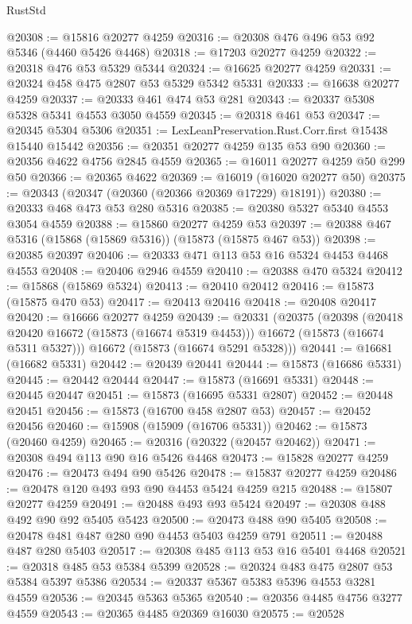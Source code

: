 \begin{lexlean}{RustStd}
\begin{coremodule}
@20308 := @15816 @20277 @4259
@20316 := @20308 @476 @496 @53 @92 @5346 (@4460 @5426 @4468)
@20318 := @17203 @20277 @4259
@20322 := @20318 @476 @53 @5329 @5344
@20324 := @16625 @20277 @4259
@20331 := @20324 @458 @475 @2807 @53 @5329 @5342 @5331
@20333 := @16638 @20277 @4259
@20337 := @20333 @461 @474 @53 @281
@20343 := @20337 @5308 @5328 @5341 @4553 @3050 @4559
@20345 := @20318 @461 @53
@20347 := @20345 @5304 @5306
@20351 := LexLeanPreservation.Rust.Corr.first @15438 @15440 @15442
@20356 := @20351 @20277 @4259 @135 @53 @90
@20360 := @20356 @4622 @4756 @2845 @4559
@20365 := @16011 @20277 @4259 @50 @299 @50
@20366 := @20365 @4622
@20369 := @16019 (@16020 @20277 @50)
@20375 := @20343 (@20347 (@20360 (@20366 @20369 @17229) @18191))
@20380 := @20333 @468 @473 @53 @280 @5316
@20385 := @20380 @5327 @5340 @4553 @3054 @4559
@20388 := @15860 @20277 @4259 @53
@20397 := @20388 @467 @5316 (@15868 (@15869 @5316)) (@15873 (@15875 @467 @53))
@20398 := @20385 @20397
@20406 := @20333 @471 @113 @53 @16 @5324 @4453 @4468 @4553
@20408 := @20406 @2946 @4559
@20410 := @20388 @470 @5324
@20412 := @15868 (@15869 @5324)
@20413 := @20410 @20412
@20416 := @15873 (@15875 @470 @53)
@20417 := @20413 @20416
@20418 := @20408 @20417
@20420 := @16666 @20277 @4259
@20439 := @20331
    (@20375
      (@20398
        (@20418 @20420 @16672 (@15873 (@16674 @5319 @4453)))
        @16672
        (@15873 (@16674 @5311 @5327)))
      @16672
      (@15873 (@16674 @5291 @5328)))
@20441 := @16681 (@16682 @5331)
@20442 := @20439 @20441
@20444 := @15873 (@16686 @5331)
@20445 := @20442 @20444
@20447 := @15873 (@16691 @5331)
@20448 := @20445 @20447
@20451 := @15873 (@16695 @5331 @2807)
@20452 := @20448 @20451
@20456 := @15873 (@16700 @458 @2807 @53)
@20457 := @20452 @20456
@20460 := @15908 (@15909 (@16706 @5331))
@20462 := @15873 (@20460 @4259)
@20465 := @20316 (@20322 (@20457 @20462))
@20471 := @20308 @494 @113 @90 @16 @5426 @4468
@20473 := @15828 @20277 @4259
@20476 := @20473 @494 @90 @5426
@20478 := @15837 @20277 @4259
@20486 := @20478 @120 @493 @93 @90 @4453 @5424 @4259 @215
@20488 := @15807 @20277 @4259
@20491 := @20488 @493 @93 @5424
@20497 := @20308 @488 @492 @90 @92 @5405 @5423
@20500 := @20473 @488 @90 @5405
@20508 := @20478 @481 @487 @280 @90 @4453 @5403 @4259 @791
@20511 := @20488 @487 @280 @5403
@20517 := @20308 @485 @113 @53 @16 @5401 @4468
@20521 := @20318 @485 @53 @5384 @5399
@20528 := @20324 @483 @475 @2807 @53 @5384 @5397 @5386
@20534 := @20337 @5367 @5383 @5396 @4553 @3281 @4559
@20536 := @20345 @5363 @5365
@20540 := @20356 @4485 @4756 @3277 @4559
@20543 := @20365 @4485 @20369 @16030
@20575 := @20528

\end{coremodule}
\end{lexlean}
